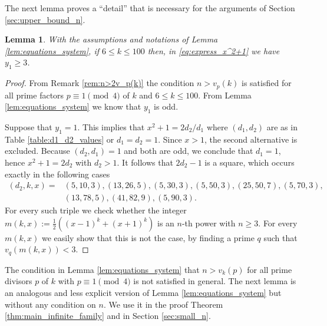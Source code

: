 \documentclass[12pt]{amsart}
\numberwithin{equation}{section}
\newtheorem{lemma}{Lemma}[section]
\theoremstyle{definition}
\theoremstyle{remark}
\begin{document}
The next lemma proves a ``detail'' that is necessary for the arguments of 
Section \ref{sec:upper_bound_n}.
%
\begin{lemma}\label{lem:y1_gt_3}
With the assumptions and notations of Lemma \ref{lem:equations_system}, if
$6\leq k\leq 100$ then, in \eqref{eq:express_x^2+1} we have $y_1\ge 3$.
\end{lemma}
%
\begin{proof}
From Remark \ref{rem:n>2v_p(k)} the condition $n>v_p(k)$ is satisfied for all prime factors $p\equiv1\pmod{4}$ of $k$ and $6\leq k\leq 100$. From Lemma \ref{lem:equations_system} we know that $y_1$ is odd. 

Suppose that $y_1=1$. This implies that $x^2 + 1 = 2d_2/d_1$ where $(d_1,d_2)$ are as in Table \ref{table:d1_d2_values} or $d_1=d_2=1$. Since $x>1$, the second alternative is excluded. Because $(d_2, d_1)=1$ and both are odd, we conclude that $d_1=1$, hence $x^2 + 1=2d_2$ with $d_2>1$. It follows that $2d_2-1$ is a square, which occurs exactly in the following cases
\begin{align*}
    (d_2,k,x) = & (5,10,3), (13,26,5), (5,30,3), (5,50,3), (25,50,7), (5,70,3),  \\
    & (13,78,5), (41,82,9), (5, 90,3).
\end{align*}
For every such triple we check whether the integer 
$m(k,x):=\frac{1}{2}\left((x-1)^k+(x+1)^k\right)$ is an $n$-th power with 
$n\ge 3$. For every $m(k,x)$ we easily show that this is not the case, by 
finding a prime $q$ such that $v_q(m(k,x))<3$.
\end{proof}

The condition in Lemma \ref{lem:equations_system} that $n > v_k(p)$ 
for all prime divisors $p$ of $k$ with $p\equiv 1\pmod{4}$ is not 
satisfied in general. The next lemma is an analogous and less explicit 
version of Lemma \ref{lem:equations_system} but without any condition 
on $n$. We use it in the proof Theorem \ref{thm:main_infinite_family}
and in Section \ref{sec:small_n}.
\end{document}
